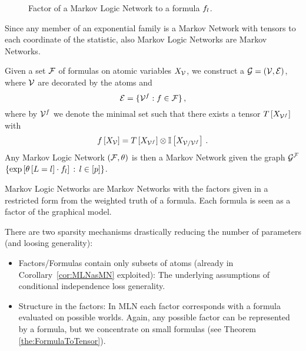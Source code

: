 \begin{figure}[h]
\begin{center}
	
\end{center}
\caption{Factor of a Markov Logic Network to a formula $f_{l}$.}
\label{fig:mlnFactor}
\end{figure}

% 
Since any member of an exponential family is a Markov Network with tensors to each coordinate of the statistic, also Markov Logic Networks are Markov Networks.

\begin{corollary}\label{cor:MLNasMN}
	Given a set $\mathcal{F}$ of formulas on atomic variables $X_{\mathcal{V}}$, we construct a $\mathcal{G}=(\mathcal{V},\mathcal{E})$, where $\mathcal{V}$ are decorated by the atoms and
		\[ \mathcal{E} = \{ \mathcal{V}^{f}: f\in\mathcal{F} \} \, , \]
	where by $\mathcal{V}^{f}$ we denote the minimal set such that there exists a tensor $T\left[X_{\mathcal{V}^{f}}\right]$ with
		\[ f\left[X_{\mathcal{V}}\right] = T\left[X_{\mathcal{V}^{f}}\right] \otimes \mathbb{I}\left[X_{\mathcal{V}/\mathcal{V}^{f}}\right] \, . \]		
	Any Markov Logic Network $(\mathcal{F},\theta)$ is then a Markov Network given the graph $\mathcal{G}^{\mathcal{F}}$
	$\{\mathrm{exp}\left[\theta\left[L=l\right]\cdot f_{l}\right]
\, :\,l\in[p]\}$.
\end{corollary}


Markov Logic Networks are Markov Networks with the factors given in a restricted form from the weighted truth of a formula.
Each formula is seen as a factor of the graphical model.

There are two sparsity mechanisms drastically reducing the number of parameters (and loosing generality):
\begin{itemize}
	\item Factors/Formulas contain only subsets of atoms (already in Corollary~\ref{cor:MLNasMN} exploited):
		The underlying assumptions of conditional independence loss generality.
	\item Structure in the factors: In MLN each factor corresponds with a formula evaluated on possible worlds.
		Again, any possible factor can be represented by a formula, but we concentrate on small formulas (see Theorem \ref{the:FormulaToTensor}).
\end{itemize}


